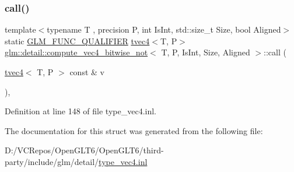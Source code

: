 \subsubsection{\texorpdfstring{call()}{call()}}
{\footnotesize\ttfamily template$<$typename T , precision P, int Is\+Int, std\+::size\+\_\+t Size, bool Aligned$>$ \\
static \mbox{\hyperlink{setup_8hpp_a33fdea6f91c5f834105f7415e2a64407}{G\+L\+M\+\_\+\+F\+U\+N\+C\+\_\+\+Q\+U\+A\+L\+I\+F\+I\+ER}} \mbox{\hyperlink{structglm_1_1tvec4}{tvec4}}$<$T, P$>$ \mbox{\hyperlink{structglm_1_1detail_1_1compute__vec4__bitwise__not}{glm\+::detail\+::compute\+\_\+vec4\+\_\+bitwise\+\_\+not}}$<$ T, P, Is\+Int, Size, Aligned $>$\+::call (\begin{DoxyParamCaption}\item[{\mbox{\hyperlink{structglm_1_1tvec4}{tvec4}}$<$ T, P $>$ const \&}]{v }\end{DoxyParamCaption})\hspace{0.3cm}{\ttfamily [inline]}, {\ttfamily [static]}}



Definition at line 148 of file type\+\_\+vec4.\+inl.



The documentation for this struct was generated from the following file\+:\begin{DoxyCompactItemize}
\item 
D\+:/\+V\+C\+Repos/\+Open\+G\+L\+T6/\+Open\+G\+L\+T6/third-\/party/include/glm/detail/\mbox{\hyperlink{type__vec4_8inl}{type\+\_\+vec4.\+inl}}\end{DoxyCompactItemize}
